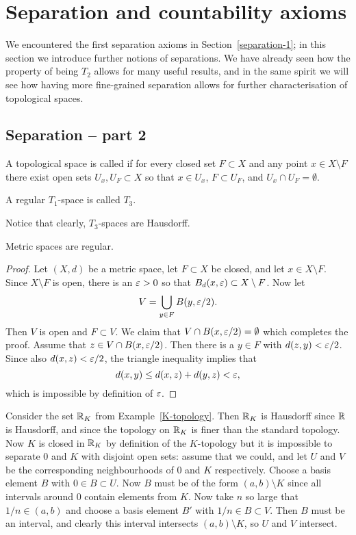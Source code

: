 \section{Separation and countability axioms}
\label{separation}
We encountered the first separation axioms in Section~\ref{separation-1}; in this section we introduce further notions of separations. We have already seen how the property of being $T_2$ allows for many useful results, and in the same spirit we will see how having more fine-grained separation allows for further characterisation of topological spaces.
\subsection{Separation -- part 2}
\begin{defn}
  A topological space is called  if for every closed set $F \subset X$ and any point $x \in X \setminus F$ there exist open sets $U_x, U_F \subset X$ so that $x \in U_x$, $F \subset U_F$, and $U_x \cap U_F = \emptyset$.
  
  A regular $T_1$-space is called $T_3$.
\end{defn}
Notice that clearly, $T_3$-spaces are Hausdorff.
\begin{prop}
  Metric spaces are regular.
\end{prop}
\begin{proof}
  Let $(X,d)$ be a metric space, let $F \subset X$ be closed, and let $x \in X \setminus F$. Since $X \setminus F$ is open, there is an $\varepsilon > 0$ so that $B_d(x,\varepsilon) \subset X \setminus F$. Now let
  \[
    V = \bigcup_{y \in F} B(y,\varepsilon/2).
  \]
  Then $V$ is open and $F \subset V$. We claim that $V \cap B(x,\varepsilon/2) = \emptyset$ which completes the proof. Assume that $z \in V \cap B(x,\varepsilon/2)$. Then there is a $y \in F$ with $d(z,y) < \varepsilon/2$. Since also $d(x,z) < \varepsilon/2$, the triangle inequality implies that
  \[
    d(x,y) \leq d(x,z) + d(y,z) < \varepsilon,
  \]
  which is impossible by definition of $\varepsilon$.
\end{proof}
\begin{example}
  Consider the set $\mathbb{R}_K$ from Example~\ref{K-topology}. Then $\mathbb{R}_K$ is Hausdorff since $\mathbb{R}$ is Hausdorff, and since the topology on $\mathbb{R}_K$ is finer than the standard topology. Now $K$ is closed in $\mathbb{R}_K$ by definition of the $K$-topology but it is impossible to separate $0$ and $K$ with disjoint open sets: assume that we could, and let $U$ and $V$ be the corresponding neighbourhoods of $0$ and $K$ respectively. Choose a basis element $B$ with $0 \in B \subset U$. Now $B$ must be of the form $(a,b) \setminus K$ since all intervals around $0$ contain elements from $K$. Now take $n$ so large that $1/n \in (a,b)$ and choose a basis element $B'$ with $1/n \in B \subset V$. Then $B$ must be an interval, and clearly this interval intersects $(a,b) \setminus K$, so $U$ and $V$ intersect.
\end{example}
